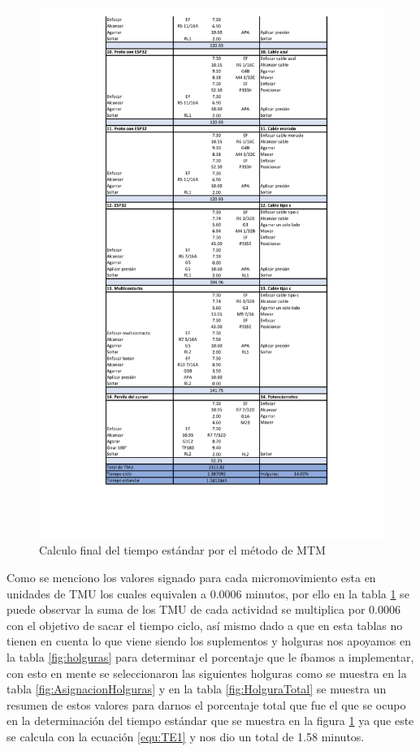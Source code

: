     \begin{figure}[H]
        \centering
        \includegraphics[trim = {20mm 30mm 20mm 1mm},clip,scale=0.3]{22/Img/tiempoEstandarSTP3.pdf}
        \caption{Calculo final del tiempo estándar por el método de MTM}
        \label{fig:STP3}
    \end{figure}
    
    Como se menciono los valores signado para cada micromovimiento esta en unidades de TMU los cuales equivalen a 0.0006 minutos, por ello en la tabla \ref{fig:STP3} se puede observar la suma de los TMU de cada actividad se multiplica por 0.0006 con el objetivo de sacar el tiempo ciclo, así mismo dado a que en esta tablas no tienen en cuenta lo que viene siendo  los suplementos y holguras nos apoyamos en la tabla \ref{fig:holguras} para determinar el porcentaje que le íbamos a implementar, con esto en mente se seleccionaron las siguientes holguras como se muestra en la tabla \ref{fig:AsignacionHolguras} y en la tabla \ref{fig:HolguraTotal} se muestra un resumen de estos valores para darnos el porcentaje total que fue el que se ocupo en la determinación del tiempo estándar que se muestra en la figura \ref{fig:STP3} ya que este se calcula con la ecuación \ref{equ:TE1} y nos dio un total de 1.58 minutos.
    

